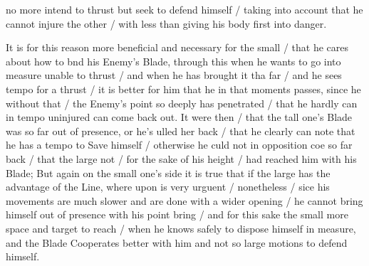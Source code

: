 \newpage


\newpage


no more intend to thrust but seek to defend himself / taking into
account that he cannot injure the other / with less than giving
his body first into danger.

It is for this reason more beneficial and necessary for the small /
that he cares about how to bnd his Enemy's Blade, through this when he
wants to go into measure unable to thrust / and when he has brought it
tha far / and he sees tempo for a thrust / it is better for him that
he in that moments passes, since he without that / 
the Enemy's point so deeply has penetrated / that he hardly can in
tempo uninjured can come back out. It were then / that the tall one's
Blade was so far out of presence, or he's ulled her back / that he
clearly can note that he has a tempo to Save himself /
otherwise he culd not in opposition coe so far back / that the large
not / for the sake of his height / had reached him with his Blade; But
again on the small one's side it is true that if the large has the
advantage of the Line, where upon is very urguent / nonetheless /
sice his movements are much slower and are done with a wider opening /
he cannot bring himself out of presence with his point bring / and for
this sake the small more space and target to reach / when he knows
safely to dispose himself in measure, and the Blade Cooperates better
with him and not so large motions to defend himself.

